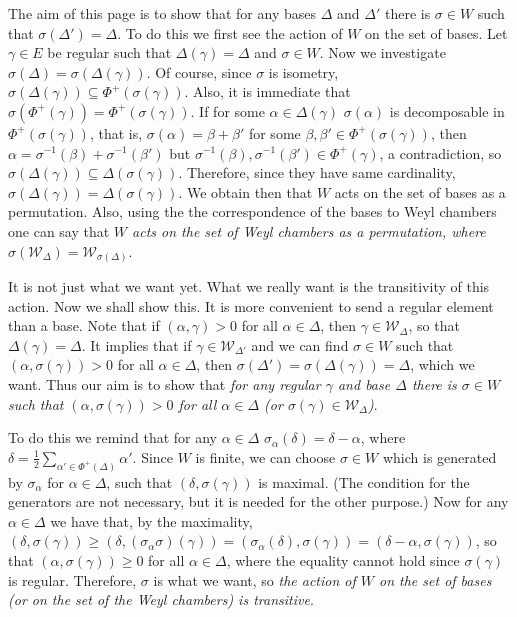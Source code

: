 \documentclass{article}
\begin{document}
The aim of this page is to show that for any bases $\Delta$ and $\Delta'$ there is $\sigma \in W$ such that $\sigma(\Delta') = \Delta$.
To do this we first see the action of $W$ on the set of bases.
Let $\gamma \in E$ be regular such that $\Delta(\gamma) = \Delta$ and $\sigma \in W$.
Now we investigate $\sigma(\Delta) = \sigma(\Delta(\gamma))$.
Of course, since $\sigma$ is isometry, $\sigma(\Delta(\gamma)) \subseteq \Phi^+(\sigma(\gamma))$.
Also, it is immediate that $\sigma(\Phi^+(\gamma)) = \Phi^+(\sigma(\gamma))$.
If for some $\alpha \in \Delta(\gamma)$ $\sigma(\alpha)$ is decomposable in $\Phi^+(\sigma(\gamma))$, that is, $\sigma(\alpha) = \beta + \beta'$ for some $\beta, \beta' \in \Phi^+(\sigma(\gamma))$, then $\alpha = \sigma^{-1} (\beta) + \sigma^{-1} (\beta')$ but $\sigma^{-1} (\beta), \sigma^{-1} (\beta') \in \Phi^+(\gamma)$, a contradiction, so $\sigma(\Delta(\gamma)) \subseteq \Delta(\sigma(\gamma))$.
Therefore, since they have same cardinality, $\sigma(\Delta(\gamma)) = \Delta(\sigma(\gamma))$.
We obtain then that $W$ acts on the set of bases as a permutation.
Also, using the the correspondence of the bases to Weyl chambers one can say that \textit{$W$ acts on the set of Weyl chambers as a permutation, where $\sigma(\mathcal{W}_\Delta) = \mathcal{W}_{\sigma(\Delta)}$}.

It is not just what we want yet.
What we really want is the transitivity of this action.
Now we shall show this.
It is more convenient to send a regular element than a base.
Note that if $(\alpha, \gamma) > 0$ for all $\alpha \in \Delta$, then $\gamma \in \mathcal{W}_\Delta$, so that $\Delta(\gamma) = \Delta$.
It implies that if $\gamma \in \mathcal{W}_{\Delta'}$ and we can find $\sigma \in W$ such that $(\alpha, \sigma(\gamma)) > 0$ for all $\alpha \in \Delta$, then $\sigma(\Delta') = \sigma(\Delta(\gamma)) = \Delta$, which we want.
Thus our aim is to show that \textit{for any regular $\gamma$ and base $\Delta$ there is $\sigma \in W$ such that $(\alpha, \sigma(\gamma)) > 0$ for all $\alpha \in \Delta$ (or $\sigma(\gamma) \in \mathcal{W}_\Delta$)}.

To do this we remind that for any $\alpha \in \Delta$ $\sigma_\alpha(\delta) = \delta - \alpha$, where $\delta = \frac{1}{2} \sum_{\alpha' \in \Phi^+(\Delta)} \alpha'$.
Since $W$ is finite, we can choose $\sigma \in W$ which is generated by $\sigma_\alpha$ for $\alpha \in \Delta$, such that $(\delta, \sigma(\gamma))$ is maximal.
(The condition for the generators are not necessary, but it is needed for the other purpose.)
Now for any $\alpha \in \Delta$ we have that, by the maximality, $(\delta, \sigma(\gamma)) \ge (\delta, (\sigma_\alpha \sigma)(\gamma)) = (\sigma_\alpha(\delta), \sigma(\gamma)) = (\delta - \alpha, \sigma(\gamma))$, so that $(\alpha, \sigma(\gamma)) \ge 0$ for all $\alpha \in \Delta$, where the equality cannot hold since $\sigma(\gamma)$ is regular.
Therefore, $\sigma$ is what we want, so \textit{the action of $W$ on the set of bases (or on the set of the Weyl chambers) is transitive}.
\end{document}
